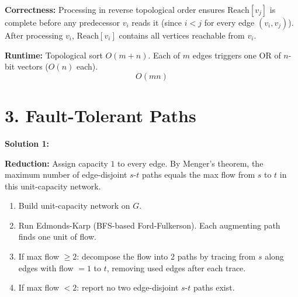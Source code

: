 \documentclass[11pt]{article}
\begin{document}
\textbf{Correctness:} Processing in reverse topological order ensures $\mathrm{Reach}[v_j]$ is complete before any predecessor $v_i$ reads it (since $i < j$ for every edge $(v_i, v_j)$). After processing $v_i$, $\mathrm{Reach}[v_i]$ contains all vertices reachable from $v_i$.

\textbf{Runtime:} Topological sort $O(m + n)$. Each of $m$ edges triggers one OR of $n$-bit vectors ($O(n)$ each).
\[\boxed{O(mn)}\]


\section*{3. Fault-Tolerant Paths}

\begin{center}
\end{center}

\textbf{Solution 1:}

\textbf{Reduction:} Assign capacity $1$ to every edge. By Menger's theorem, the maximum number of edge-disjoint $s$-$t$ paths equals the max flow from $s$ to $t$ in this unit-capacity network.

\begin{enumerate}[leftmargin=*,itemsep=2pt]
\item Build unit-capacity network on $G$.
\item Run Edmonds-Karp (BFS-based Ford-Fulkerson). Each augmenting path finds one unit of flow.
\item If max flow $\ge 2$: decompose the flow into 2 paths by tracing from $s$ along edges with flow $= 1$ to $t$, removing used edges after each trace.
\item If max flow $< 2$: report no two edge-disjoint $s$-$t$ paths exist.
\end{enumerate}
\end{document}
